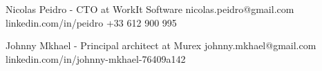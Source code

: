 

\cvref
    {Nicolas Peidro - CTO at WorkIt Software}
    {nicolas.peidro@gmail.com}
    {linkedin.com/in/peidro}
    {+33 612 900 995}

\divider

\cvref
    {Johnny Mkhael - Principal architect at Murex}
    {johnny.mkhael@gmail.com}
    {linkedin.com/in/johnny-mkhael-76409a142}
    {}